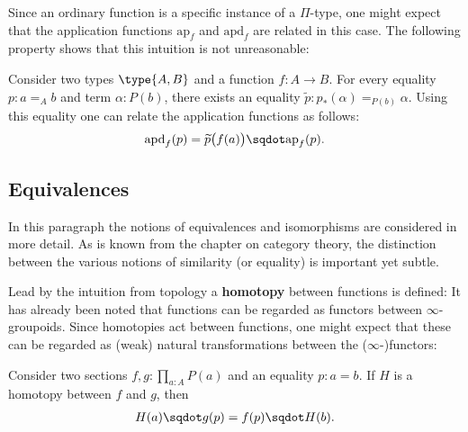     Since an ordinary function is a specific instance of a $\Pi$-type, one might expect that the application functions $\mathrm{ap}_f$ and $\mathrm{apd}_f$ are related in this case. The following property shows that this intuition is not unreasonable:
    \begin{property}
        Consider two types $\type{A,B}$ and a function $f:A\rightarrow B$. For every equality $p:a=_Ab$ and term $\alpha:P(b)$, there exists an equality $\widetilde{p}:p_*(\alpha)=_{P(b)}\alpha$. Using this equality one can relate the application functions as follows:
        \begin{gather}
            \mathrm{apd}_f(p) = \widetilde{p}\big(f(a)\big)\sqdot\mathrm{ap}_f(p).
        \end{gather}
    \end{property}

\subsection{Equivalences}

    In this paragraph the notions of equivalences and isomorphisms are considered in more detail. As is known from the chapter on category theory, the distinction between the various notions of similarity (or equality) is important yet subtle.

    Lead by the intuition from topology a \textbf{homotopy} between functions is defined:
    It has already been noted that functions can be regarded as functors between $\infty$-groupoids. Since homotopies act between functions, one might expect that these can be regarded as (weak) natural transformations between the ($\infty$-)functors:
    \begin{property}
        Consider two sections $f,g:\prod_{a:A}P(a)$ and an equality $p:a=b$. If $H$ is a homotopy between $f$ and $g$, then
        \begin{gather}
            H(a)\sqdot g(p) = f(p)\sqdot H(b).
        \end{gather}
    \end{property}

